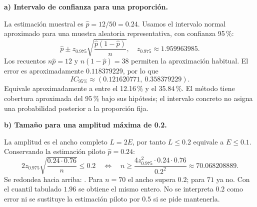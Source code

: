 \textbf{a) Intervalo de confianza para una proporción.}\par\nopagebreak[4]
La estimación muestral es $\widehat p=12/50=0.24$. Usamos el intervalo normal aproximado para una muestra aleatoria representativa, con confianza 95\,\%:
\[
\widehat p\pm z_{0.975}\sqrt{\frac{\widehat p(1-\widehat p)}{n}},
\quad z_{0.975}\approx1.959963985.
\]
Los recuentos $n\widehat p=12$ y $n(1-\widehat p)=38$ permiten la aproximación habitual. El error es aproximadamente $0.118379229$, por lo que
\[
\boxed{IC_{\text{95\%}}\approx(0.121620771,\ 0.358379229).}
\]
Equivale aproximadamente a entre el 12.16\,\% y el 35.84\,\%. El método tiene cobertura aproximada del 95\,\% bajo sus hipótesis; el intervalo concreto no asigna una probabilidad posterior a la proporción fija.

\textbf{b) Tamaño para una amplitud máxima de 0.2.}\par\nopagebreak[4]
La amplitud es el ancho completo $L=2E$, por tanto $L\leq0.2$ equivale a $E\leq0.1$. Conservando la estimación piloto $\widehat p=0.24$:
\[
2z_{0.975}\sqrt{\frac{0.24\cdot0.76}{n}}\leq0.2
\quad\Longleftrightarrow\quad
n\geq\frac{4z_{0.975}^2\cdot0.24\cdot0.76}{0.2^2}
\approx70.068208889.
\]
Se redondea hacia arriba: . Para $n=70$ el ancho supera $0.2$; para $71$ ya no. Con el cuantil tabulado $1.96$ se obtiene el mismo entero. No se interpreta $0.2$ como error ni se sustituye la estimación piloto por $0.5$ si se pide mantenerla.
